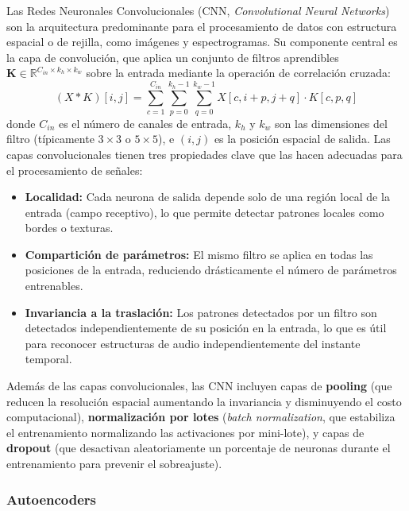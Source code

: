 Las Redes Neuronales Convolucionales (CNN, \textit{Convolutional Neural Networks}) son la arquitectura predominante para el procesamiento de datos con estructura espacial o de rejilla, como imágenes y espectrogramas. Su componente central es la capa de convolución, que aplica un conjunto de filtros aprendibles $\mathbf{K} \in \mathbb{R}^{C_{in} \times k_h \times k_w}$ sobre la entrada mediante la operación de correlación cruzada:
\begin{equation}
    (X * K)[i, j] = \sum_{c=1}^{C_{in}} \sum_{p=0}^{k_h-1} \sum_{q=0}^{k_w-1} X[c, i+p, j+q] \cdot K[c, p, q]
\end{equation}
donde $C_{in}$ es el número de canales de entrada, $k_h$ y $k_w$ son las dimensiones del filtro (típicamente $3 \times 3$ o $5 \times 5$), e $(i, j)$ es la posición espacial de salida. Las capas convolucionales tienen tres propiedades clave que las hacen adecuadas para el procesamiento de señales:

\begin{itemize}
    \item \textbf{Localidad:} Cada neurona de salida depende solo de una región local de la entrada (campo receptivo), lo que permite detectar patrones locales como bordes o texturas.
    \item \textbf{Compartición de parámetros:} El mismo filtro se aplica en todas las posiciones de la entrada, reduciendo drásticamente el número de parámetros entrenables.
    \item \textbf{Invariancia a la traslación:} Los patrones detectados por un filtro son detectados independientemente de su posición en la entrada, lo que es útil para reconocer estructuras de audio independientemente del instante temporal.
\end{itemize}

Además de las capas convolucionales, las CNN incluyen capas de \textbf{pooling} (que reducen la resolución espacial aumentando la invariancia y disminuyendo el costo computacional), \textbf{normalización por lotes} (\textit{batch normalization}, que estabiliza el entrenamiento normalizando las activaciones por mini-lote), y capas de \textbf{dropout} (que desactivan aleatoriamente un porcentaje de neuronas durante el entrenamiento para prevenir el sobreajuste).

\subsubsection{Autoencoders}

